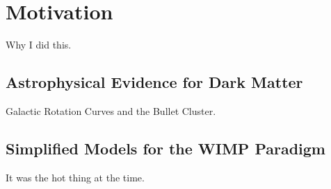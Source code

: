 \chapter{Motivation}

Why I did this.

\section{Astrophysical Evidence for Dark Matter}

Galactic Rotation Curves and the Bullet Cluster.

\section{Simplified Models for the WIMP Paradigm}

It was the hot thing at the time.
